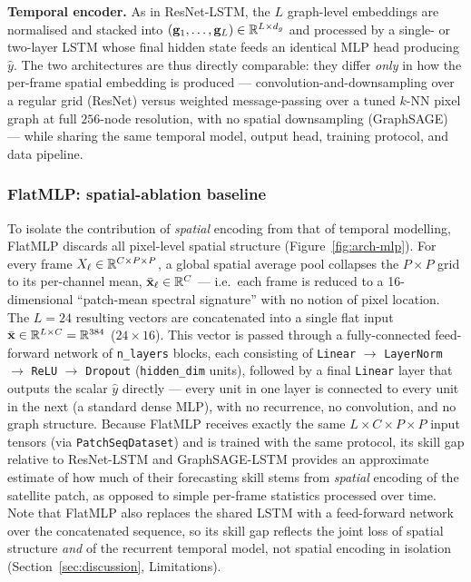 \textbf{Temporal encoder.} As in ResNet-LSTM, the $L$ graph-level embeddings
are normalised and stacked into $(\mathbf{g}_1,\ldots,\mathbf{g}_L) \in
\mathbb{R}^{L \times d_g}$ and processed by a single- or two-layer LSTM whose final
hidden state feeds an identical MLP head producing $\hat{y}$. The two
architectures are thus directly comparable: they differ \emph{only} in how
the per-frame spatial embedding is produced --- convolution-and-downsampling
over a regular grid (ResNet) versus weighted message-passing over a tuned
$k$-NN pixel graph at full $256$-node resolution, with no spatial downsampling
(GraphSAGE) --- while sharing the same temporal model, output head, training
protocol, and data pipeline.

\subsubsection{FlatMLP: spatial-ablation baseline}
\label{ssec:mlp}

To isolate the contribution of \emph{spatial} encoding from that of temporal
modelling, FlatMLP discards all pixel-level spatial structure
(Figure~\ref{fig:arch-mlp}). For every
frame $X_\ell \in \mathbb{R}^{C \times P \times P}$, a global spatial average pool
collapses the $P \times P$ grid to its per-channel mean, $\bar{\mathbf{x}}_\ell
\in \mathbb{R}^{C}$ --- i.e.\ each frame is reduced to a 16-dimensional ``patch-mean
spectral signature'' with no notion of pixel location. The $L = 24$ resulting
vectors are concatenated into a single flat input
$\bar{\mathbf{x}} \in \mathbb{R}^{L \times C} = \mathbb{R}^{384}$ ($24 \times 16$). This
vector is passed through a fully-connected feed-forward network of
\texttt{n\_layers} blocks, each consisting of \texttt{Linear} $\to$
\texttt{LayerNorm} $\to$ \texttt{ReLU} $\to$ \texttt{Dropout}
(\texttt{hidden\_dim} units), followed by a final \texttt{Linear} layer that
outputs the scalar $\hat{y}$ directly --- every unit in one layer is connected
to every unit in the next (a standard dense MLP), with no recurrence, no
convolution, and no graph structure. Because FlatMLP receives exactly the
same $L\times C \times P \times P$ input tensors (via \texttt{PatchSeqDataset})
and is trained with the same protocol, its skill gap relative to ResNet-LSTM
and GraphSAGE-LSTM provides an approximate estimate of how much of their
forecasting skill stems from \emph{spatial} encoding of the satellite patch,
as opposed to simple per-frame statistics processed over time. Note that
FlatMLP also replaces the shared LSTM with a feed-forward network over the
concatenated sequence, so its skill gap reflects the joint loss of spatial
structure \emph{and} of the recurrent temporal model, not spatial encoding
in isolation (Section~\ref{sec:discussion}, Limitations).

